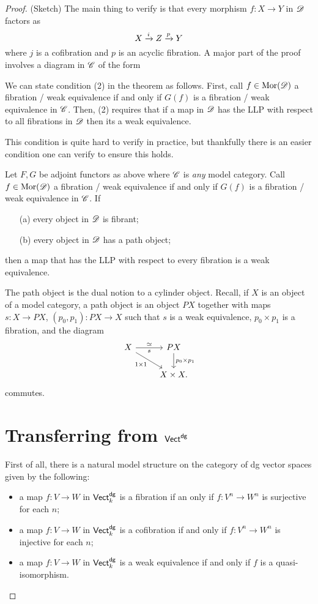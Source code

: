 \documentclass[11pt]{amsart}
\begin{document}
\begin{proof} (Sketch)
The main thing to verify is that every morphism $f : X \to Y$ in $\mathscr D$ factors as
\[
X \xrightarrow{i} Z \xrightarrow{p} Y
\]
where $j$ is a cofibration and $p$ is an acyclic fibration. 
A major part of the proof involves a diagram in $\mathscr C$ of the form



We can state condition (2) in the theorem as follows. 
First, call $f \in {\rm Mor}(\mathscr D)$ a fibration / weak equivalence if and only if $G(f)$ is a fibration / weak equivalence in $\mathscr C$. 
Then, (2) requires that if a map in $\mathscr D$ has the LLP with respect to all fibrations in $\mathscr D$ then its a weak equivalence. 

This condition is quite hard to verify in practice, but thankfully there is an easier condition one can verify to ensure this holds. 

\begin{prop}\label{prop: easy}
Let $F,G$ be adjoint functors as above where $\mathscr C$ is {\em any} model category. 
Call $f \in {\rm Mor}(\mathscr D)$ a fibration / weak equivalence if and only if $G(f)$ is a fibration / weak equivalence in $\mathscr C$. 
If
\begin{itemize}
\item[(a)] every object in $\mathscr D$ is fibrant;
\item[(b)] every object in $\mathscr D$ has a path object;
\end{itemize}
then a map that has the LLP with respect to every fibration is a weak equivalence.
\end{prop}

\begin{rmk}
The path object is the dual notion to a cylinder object.
Recall, if $X$ is an object of a model category, a path object is an object $PX$ together with maps $s : X \to PX$, $(p_0,p_1) : PX \to X$ such that $s$ is a weak equivalence, $p_0 \times p_1$ is a fibration, and the diagram
\[
\begin{tikzcd}
X \ar[r,"s"', "\simeq"]  \ar[dr, "1 \times 1"'] & P X \ar[d, "p_0 \times p_1"] \\
& X \times X .
\end{tikzcd}
\]
commutes.
\end{rmk}

\section{Transferring from ${\sf Vect}^{\sf dg}$}

First of all, there is a natural model structure on the category of dg vector spaces given by the following:
\begin{itemize}
\item a map $f : V \to W$ in ${\sf Vect}^{\sf dg}_k$ is a fibration if an only if $f : V^n \to W^n$ is surjective for each $n$;
\item a map $f : V \to W$ in ${\sf Vect}^{\sf dg}_k$ is a cofibration if and only if $f : V^n \to W^n$ is injective for each $n$;
\item a map $f : V \to W$ in ${\sf Vect}^{\sf dg}_k$ is a weak equivalence if and only if $f$ is a quasi-isomorphism. 
\end{itemize}


\end{proof}
\end{document}
